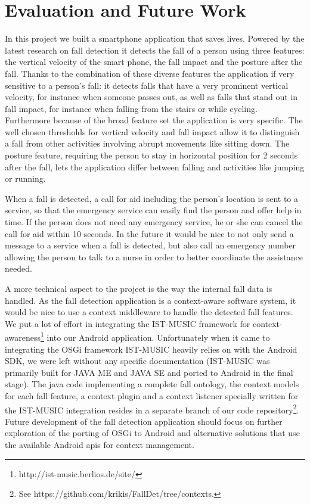 \documentclass[a4paper, 10pt]{article}
\begin{document}
\newpage
\section{Evaluation and Future Work}
In this project we built a smartphone application that saves lives. Powered by the latest research on fall detection it detects the fall of a person using three features: the vertical velocity of the smart phone, the fall impact and the posture after the fall. Thanks to the combination of these diverse features the application if very sensitive to a person's fall: it detects falls that have a very prominent vertical velocity, for instance when someone passes out, as well as falls that stand out in fall impact, for instance when falling from the stairs or while cycling. Furthermore because of the broad feature set the application is very specific. The well chosen thresholds for vertical velocity and fall impact allow it to distinguish a fall from other activities involving abrupt movements like sitting down. The posture feature, requiring the person to stay in horizontal position for 2 seconds after the fall, lets the application differ between falling and activities like jumping or running. 

When a fall is detected, a call for aid including the person's location is sent to a service, so that  
the emergency service can easily find the person and offer help in time. If the person does not need any emergency service, he or she can cancel the call for aid within 10 seconds. In the future it would be nice to not only send a message to a service when a fall is detected, but also call an emergency number allowing the person to talk to a nurse in order to better coordinate the assistance needed.

A more technical aspect to the project is the way the internal fall data is handled. As the fall detection application is a context-aware software system, it would be nice to use a context middleware to handle the detected fall features. We put a lot of effort in integrating the IST-MUSIC framework for context-awareness\footnote{http://ist-music.berlios.de/site/} into our Android application. Unfortunately when it came to integrating the OSGi framework IST-MUSIC heavily relies on with the Android SDK, we were left without any specific documentation (IST-MUSIC was primarily built for JAVA ME and JAVA SE and ported to Android in the final stage). The java code implementing a complete fall ontology, the context models for each fall feature, a context plugin and a context listener specially written for the IST-MUSIC integration resides in a separate branch of our code repository\footnote{See https://github.com/krikis/FallDet/tree/contexts.}. Future development of the fall detection application should focus on further exploration of the porting of OSGi to Android and alternative solutions that use the available Android apis for context management.
\end{document}
